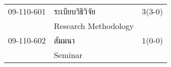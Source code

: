 \begin{longtable}{p{}p{}r{}}
09-110-601 & ระเบียบวิธีวิจัย & 3(3-0)\\
& Research Methodology & \\[3mm]
09-110-602 & สัมมนา & 1(0-0)\\
& Seminar & \\[3mm]
\end{longtable}
